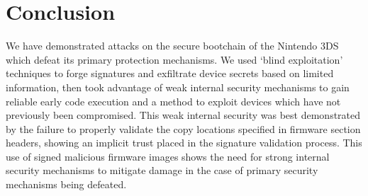 \documentclass[journal]{IEEEtran}
\begin{document}
\section{Conclusion}

We have demonstrated attacks on the secure bootchain of the Nintendo 3DS which
defeat its primary protection mechanisms. We used `blind exploitation'
techniques to forge signatures and exfiltrate device secrets based on limited
information, then took advantage of weak internal security mechanisms to gain
reliable early code execution and a method to exploit devices which have not
previously been compromised. This weak internal security was best demonstrated
by the failure to properly validate the copy locations specified in firmware
section headers, showing an implicit trust placed in the signature validation
process. This use of signed malicious firmware images shows the need for strong
internal security mechanisms to mitigate damage in the case of primary security
mechanisms being defeated.





%



\end{document}
